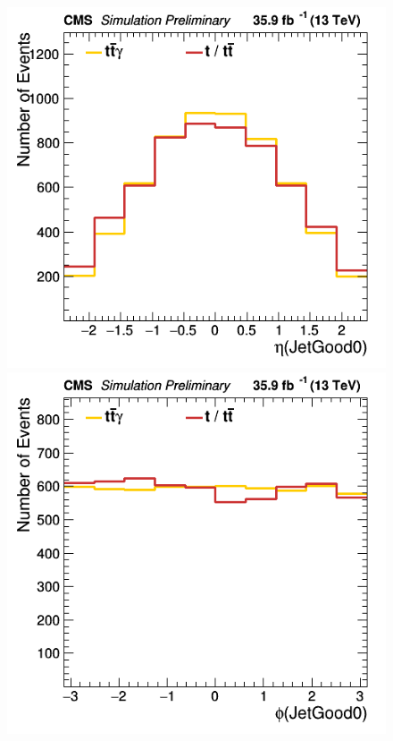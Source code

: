 \documentclass[11pt]{scrartcl}
\begin{document}
	\begin{figure}[H]
	\centering
	\begin{minipage}{.5\textwidth}
	  \centering
	  \includegraphics[width=0.70\linewidth]{figures/Select1/JetGood0_eta.png}
	\end{minipage}%
	\begin{minipage}{.5\textwidth}
	  \centering
	  \includegraphics[width=0.70\linewidth]{figures/Select1/JetGood0_phi.png}
	\end{minipage}
	\label{fig:JetGood0phi}
	\end{figure}
	
\end{document}
